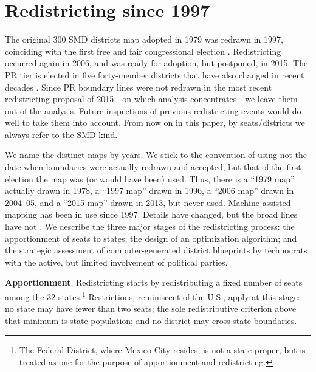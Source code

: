 \documentclass[letter,12pt]{article}
\begin{document}
\section{Redistricting since 1997}

The original 300 SMD districts map adopted in 1979 was redrawn in 1997, coinciding with the first free and fair congressional election \citep{lujambio.vives.2008}. Redistricting occurred again in 2006, and was ready for adoption, but postponed, in 2015. The PR tier is elected in five forty-member districts that have also changed in recent decades \citep{palacios.tiradoCircPluris2009}. Since PR boundary lines were not redrawn in the most recent redistricting proposal of 2015---on which analysis concentrates---we leave them out of the analysis. Future inspections of previous redistricting events would do well to take them into account. From now on in this paper, by seats/districts we always refer to the SMD kind. 

We name the distinct maps by years. We stick to the convention of using not the date when boundaries were actually redrawn and accepted, but that of the first election the map was (or would have been) used. Thus, there is a ``1979 map'' actually drawn in 1978, a ``1997 map'' drawn in 1996, a ``2006 map'' drawn in 2004--05, and a ``2015 map'' drawn in 2013, but never used. Machine-assisted mapping has been in use since 1997. Details have changed, but the broad lines have not \citep{trelles.mtz.polygob2012}. We describe the three major stages of the redistricting process: the apportionment of seats to states; the design of an optimization algorithm; and the strategic assessment of computer-generated district blueprints by technocrats with the active, but limited involvement of political parties. 

\textbf{Apportionment}. Redistricting starts by redistributing a fixed number of seats among the 32 states.\footnote{The Federal District, where Mexico City resides, is not a state proper, but is treated as one for the purpose of apportionment and redistricting.} Restrictions, reminiscent of the U.S., apply at this stage: no state may have fewer than two seats; the sole redistributive criterion above that minimum is state population; and no district may cross state boundaries. 
\end{document}
